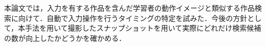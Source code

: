 \documentclass[uplatex,dvipdfmx,a4paper,twocolumn,base=11pt,jbase=11pt,ja=standard]{bxjsarticle}  %
\newcommand{\todo}[1]{\colorbox{yellow}{{\bf TODO}:}{\color{red} {\textbf{[#1]}}}}
\begin{document}






本論文では，入力を有する作品を含んだ学習者の動作イメージと類似する作品検索に向けて．自動で入力操作を行うタイミングの特定を試みた．今後の方針として，本手法を用いて撮影したスナップショットを用いて実際にどれだけ検索候補の数が向上したかどうかを確かめる．

\end{document}
